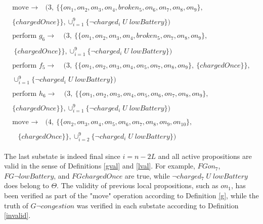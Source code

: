 \documentclass[a4paper,fleqn]{cas-dc}
\begin{document}
\begin{align*}
\begin{split}
\end{split}
\\\begin{split}
\text{move } \to \ & (3, \ \{\{on_1, on_2, on_3, on_4, broken_5, on_6, on_7, on_8, on_9\},\ 
\end{split}\\
\begin{split}
\{chargedOnce\}\}, \cup_{i=1}^{9}\{\neg charged_i \; U \; lowBattery\})
\end{split}
\\\begin{split}
\text{perform } g_6 \to \ & (3, \ \{\{on_1, on_2, on_3, on_4, broken_5, on_7, on_8, on_9\},
\end{split}\\
\begin{split}
\ \{chargedOnce\}\}, \cup_{i=1}^{9}\{\neg charged_i \; U \; lowBattery\})
\end{split}
\\\begin{split}
\text{perform } f_5 \to \ & (3, \ \{\{on_1, on_2, on_3, on_4, on_5, on_7, on_8, on_9\},\ \{chargedOnce\}\}, 
\end{split}\\
\begin{split}
\cup_{i=1}^{9}\{\neg charged_i \; U \; lowBattery\})
\end{split}
\\\begin{split}
\text{perform } h_6 \to \ & (3, \ \{\{on_1, on_2, on_3, on_4, on_5, on_6, on_7, on_8, on_9\},\ 
\end{split}\\
\begin{split}
\{chargedOnce\}\}, \cup_{i=1}^{9}\{\neg charged_i \; U \; lowBattery\})
\end{split}
\\\begin{split}
\text{move } \to \ & (4, \ \{\{on_2, on_3, on_4, on_5, on_6, on_7, on_8, on_9, on_{10}\},\ 
\end{split}\\
\begin{split}
& \{chargedOnce\}\}, \cup_{i=2}^{9}\{\neg charged_i \; U \; lowBattery\})
\end{split}
 \end{align*}
\normalsize

The last substate is indeed final since $i=n-2L$ and all active propositions are valid in the sense of Definitions \ref{gval} and
\ref{lval}. For example, $FGon_7$, $FG\neg lowBattery$, and $FG chargedOnce$ are true, while $\neg charged_7 \; U\; lowBattery$ does belong
to $\Theta$. The validity of previous local propositions, such as $on_1$, has been verified as part of the "move" operation according
to Definition \ref{g}, while the truth of $G \neg congestion$ was verified in each substate according to Definition \ref{invalid}.
\end{document}
